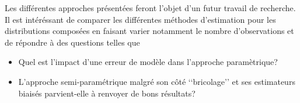 Les différentes approches présentées feront l'objet d'un futur travail de recherche. Il est intéréssant de comparer les différentes méthodes d'estimation pour les distributions composées en faisant varier notamment le nombre d'observations et de répondre à des questions telles que 
\begin{itemize}
\item Quel est l'impact d'une erreur de modèle dans l'approche paramètrique? 
\item L'approche semi-paramétrique malgré son côté \lq\lq{}bricolage\rq\rq{} et ses estimateurs biaisés parvient-elle à renvoyer de bons résultats? 
\end{itemize} 






